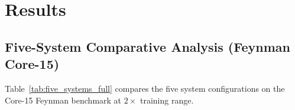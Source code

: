 
\section{Results}
\label{sec:results}

\subsection{Five-System Comparative Analysis (Feynman Core-15)}\label{subsec:fivesystem-comparative-analysis-feynman-}
\label{sec:five_systems}

Table~\ref{tab:five_systems_full} compares the five system configurations on the
Core-15 Feynman benchmark at $2\times$ training range.

